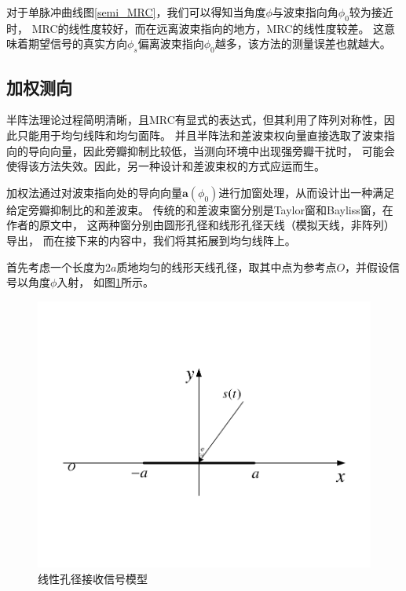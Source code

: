 \documentclass[master]{thesis-uestc}
\begin{document}
对于单脉冲曲线图\ref{semi_MRC}，我们可以得知当角度$\phi$与波束指向角$\phi_0$较为接近时，
MRC的线性度较好，而在远离波束指向的地方，MRC的线性度较差。
这意味着期望信号的真实方向$\phi_s$偏离波束指向$\phi_0$越多，该方法的测量误差也就越大。

\subsection{加权测向}
半阵法理论过程简明清晰，且MRC有显式的表达式，但其利用了阵列对称性，因此只能用于均匀线阵和均匀面阵。
并且半阵法和差波束权向量直接选取了波束指向的导向向量，因此旁瓣抑制比较低，当测向环境中出现强旁瓣干扰时，
可能会使得该方法失效。因此，另一种设计和差波束权的方式应运而生。

加权法通过对波束指向处的导向向量$\bm{a}(\phi_0)$进行加窗处理，从而设计出一种满足给定旁瓣抑制比的和差波束。
传统的和差波束窗分别是Taylor窗和Bayliss窗，在作者的原文中，
这两种窗分别由圆形孔径和线形孔径天线（模拟天线，非阵列）导出，
而在接下来的内容中，我们将其拓展到均匀线阵上。

首先考虑一个长度为$2a$质地均匀的线形天线孔径，取其中点为参考点$O$，并假设信号以角度$\phi$入射，
如图\ref{linear_aperture}所示。
\begin{figure}[h]
    \includegraphics[scale=0.8]{pic/linear aperture.pdf}
    \caption{线性孔径接收信号模型}
    \label{linear_aperture}
\end{figure}
\end{document}
